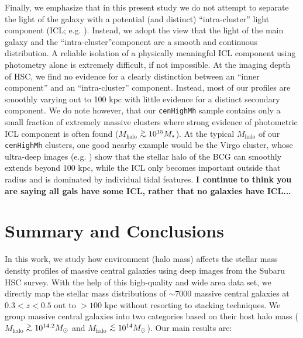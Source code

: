 \documentclass[a4paper,fleqn,usenatbib]{mnras}
\def\simlt{\lower.5ex\hbox{$\; \buildrel < \over {\sim} \;$}}
\def\simgt{\lower.5ex\hbox{$\; \buildrel > \over {\sim} \;$}}
\def\rbcg{\texttt{cenHighMh}}
\def\mhalo{{$M_{\mathrm{halo}}$}}
\begin{document}
    Finally, we emphasize that in this present study we do not attempt to separate the 
    light of the galaxy with a potential (and distinct) ``intra-cluster''
    light component (ICL; e.g. \citealt{Carlberg1997, Lin2004, Gonzalez2005, 
    Mihos2005}). 
    Instead, we adopt the view that the light of the main galaxy and the 
    ``intra-cluster''component are a smooth and continuous distribution. 
    A reliable isolation of a physically meaningful ICL component using photometry 
    alone is extremely difficult, if not impossible. 
    At the imaging depth of HSC, we find no evidence for a clearly distinction between 
    an ``inner component'' and an ``intra-cluster'' component. 
    Instead, most of our profiles are smoothly varying out to 100 kpc with little 
    evidence for a distinct secondary component. 
    We do note however, that our \rbcg{} sample contains only a small fraction of 
    extremely massive clusters where strong evidence of photometric ICL component is 
    often found (\mhalo{}$\simgt 10^{15}M_{\star}$). 
    At the typical \mhalo{} of our \rbcg{} clusters, one good nearby example would be 
    the Virgo cluster, whose ultra-deep images (e.g. \citealt{Mihos2016}) show
    that the stellar halo of the BCG can smoothly extends beyond 100 kpc, while the 
    ICL only becomes important outside that radius and is dominated by individual 
    tidal features. {\bf I continue to think you are saying all gals have some ICL, rather 
    that no galaxies have ICL...}


\section{Summary and Conclusions}
    \label{sec:summary}

    In this work, we study how environment (halo mass) affects the stellar mass density 
    profiles of massive central galaxies using deep images from the Subaru HSC 
    survey. 
    With the help of this high-quality and wide area data set, we directly map the 
    stellar mass distributions of ${\sim}7000$ massive central galaxies at 
    $0.3 < z < 0.5$ out to $>100$ kpc without resorting to stacking techniques. 
    We group massive central galaxies into two categories based on their host halo 
    mass (\mhalo{}$\simgt 10^{14.2} M_{\odot}$ and \mhalo{}$\simlt 10^{14} M_{\odot}$). 
    Our main results are:  
    
\end{document}
